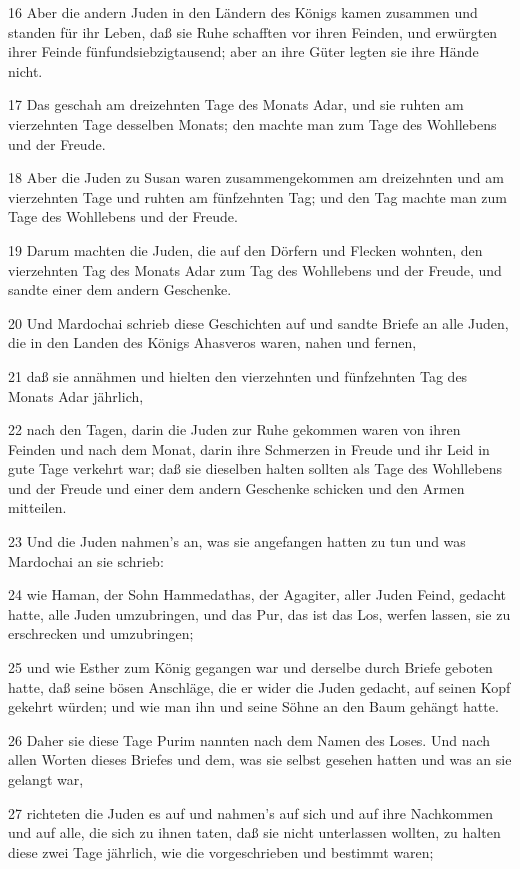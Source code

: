 \par 16 Aber die andern Juden in den Ländern des Königs kamen zusammen und standen für ihr Leben, daß sie Ruhe schafften vor ihren Feinden, und erwürgten ihrer Feinde fünfundsiebzigtausend; aber an ihre Güter legten sie ihre Hände nicht.
\par 17 Das geschah am dreizehnten Tage des Monats Adar, und sie ruhten am vierzehnten Tage desselben Monats; den machte man zum Tage des Wohllebens und der Freude.
\par 18 Aber die Juden zu Susan waren zusammengekommen am dreizehnten und am vierzehnten Tage und ruhten am fünfzehnten Tag; und den Tag machte man zum Tage des Wohllebens und der Freude.
\par 19 Darum machten die Juden, die auf den Dörfern und Flecken wohnten, den vierzehnten Tag des Monats Adar zum Tag des Wohllebens und der Freude, und sandte einer dem andern Geschenke.
\par 20 Und Mardochai schrieb diese Geschichten auf und sandte Briefe an alle Juden, die in den Landen des Königs Ahasveros waren, nahen und fernen,
\par 21 daß sie annähmen und hielten den vierzehnten und fünfzehnten Tag des Monats Adar jährlich,
\par 22 nach den Tagen, darin die Juden zur Ruhe gekommen waren von ihren Feinden und nach dem Monat, darin ihre Schmerzen in Freude und ihr Leid in gute Tage verkehrt war; daß sie dieselben halten sollten als Tage des Wohllebens und der Freude und einer dem andern Geschenke schicken und den Armen mitteilen.
\par 23 Und die Juden nahmen's an, was sie angefangen hatten zu tun und was Mardochai an sie schrieb:
\par 24 wie Haman, der Sohn Hammedathas, der Agagiter, aller Juden Feind, gedacht hatte, alle Juden umzubringen, und das Pur, das ist das Los, werfen lassen, sie zu erschrecken und umzubringen;
\par 25 und wie Esther zum König gegangen war und derselbe durch Briefe geboten hatte, daß seine bösen Anschläge, die er wider die Juden gedacht, auf seinen Kopf gekehrt würden; und wie man ihn und seine Söhne an den Baum gehängt hatte.
\par 26 Daher sie diese Tage Purim nannten nach dem Namen des Loses. Und nach allen Worten dieses Briefes und dem, was sie selbst gesehen hatten und was an sie gelangt war,
\par 27 richteten die Juden es auf und nahmen's auf sich und auf ihre Nachkommen und auf alle, die sich zu ihnen taten, daß sie nicht unterlassen wollten, zu halten diese zwei Tage jährlich, wie die vorgeschrieben und bestimmt waren;
